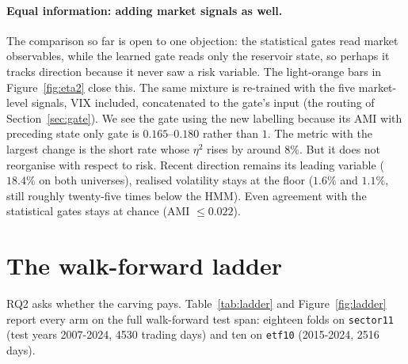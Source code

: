 \paragraph{Equal information: adding market signals as well.}
The comparison so far is open to one objection: the statistical gates read market observables, while the learned gate reads only the reservoir state, so perhaps it tracks direction because it never saw a risk variable. The light-orange bars in Figure~\ref{fig:eta2} close this. The same mixture is re-trained with the five market-level signals, VIX included, concatenated to the gate's input (the routing of Section~\ref{sec:gate}). We see the gate using the new labelling because its AMI with preceding state only gate is  $0.165$--$0.180$ rather than $1$. The metric with the largest change is the short rate whose $\eta^2$ rises by around $8\%$. But it does not reorganise with respect to risk. Recent direction remains its leading variable ($18.4\%$ on both universes), realised volatility stays at the floor ($1.6\%$ and $1.1\%$, still roughly twenty-five times below the HMM). Even agreement with the statistical gates stays at chance (AMI $\le 0.022$).

\section{The walk-forward ladder}
\label{sec:results-ladder}

RQ2 asks whether the carving pays. Table~\ref{tab:ladder} and Figure~\ref{fig:ladder} report every arm on the full walk-forward test span: eighteen folds on \texttt{sector11} (test years 2007-2024, 4530 trading
days) and ten on \texttt{etf10} (2015-2024, 2516 days).

